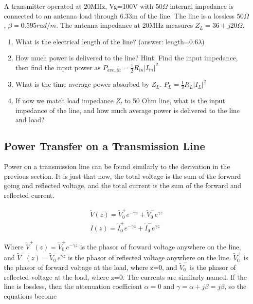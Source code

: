 \documentclass{ximera}
\begin{document}
\begin{example}
A transmitter operated at 20MHz, Vg=100V with $50 \Omega$ internal impedance is connected to an antenna load through 6.33m of the line. The line is a lossless $50 \Omega$, $\beta=0.595rad/m$. The antenna impedance at 20MHz measures $Z_L=36+j20 \Omega$. 
\begin{enumerate}
\item What is the electrical length of the line? (answer: length=0.6$\lambda$)
\item How much power is delivered to the line? Hint: Find the input impedance, then find the input power as $P_{ave,in}=\frac{1}{2}R_{in} |I_{in}|^2$
\item What is the time-average power absorbed by $Z_L$. $P_{L}=\frac{1}{2} R_L |I_{L}|^2$
\item If now we match load impedance $Z_l$ to 50 Ohm line, what is the input impedance of the line, and how much average power is delivered to the line and load?
\end{enumerate}

\end{example}


\subsection*{Power Transfer on a Transmission Line}

Power on a transmission line can be found similarly to the derivation in the previous section. It is just that now, the total voltage is the sum of the forward going and reflected voltage, and the total current is the sum of the forward and reflected current. 


\begin{eqnarray}
\tilde{V}(z)=\tilde{V}_0^+ e^{-\gamma z} + \tilde{V}_0^- e^{\gamma z}\label{eq4a} \\
I(z)=\tilde{I}_0^+ e^{-\gamma z} + \tilde{I}_0^- e^{\gamma z}\label{eq5a}
\end{eqnarray}

Where $\tilde{V}^+(z)=\tilde{V}_0^+ e^{-\gamma z} $ is the phasor of forward voltage anywhere on the line, and $\tilde{V}^-(z)=\tilde{V}_0^- e^{\gamma z}$ is the phasor of reflected voltage anywhere on the line. $\tilde{V}_0^+$ is the phasor of forward voltage at the load, where z=0, and  $\tilde{V}_0^-$ is the phasor of reflected voltage at the load, where z=0.  The currents are similarly named. If the line is lossless, then the attenuation coefficient $\alpha=0$ and $\gamma= \alpha + j \beta = j \beta$, so the equations become
\end{document}
